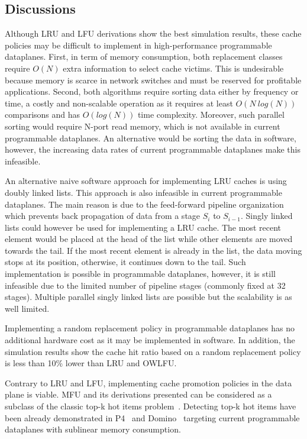 \subsection{Discussions}

Although LRU and LFU derivations show the best simulation results, these cache policies may be difficult to implement in high-performance programmable dataplanes.
First, in term of memory consumption, both replacement classes require $O(N)$ extra information to select cache victims.
This is undesirable because memory is scarce in network switches and must be reserved for profitable applications.
Second, both algorithms require sorting data either by frequency or time, a costly and non-scalable operation as it requires at least $O(N~log(N))$ comparisons and has $O(log(N))$ time complexity.
Moreover, such parallel sorting would require N-port read memory, which is not available in current programmable dataplanes.
An alternative would be sorting the data in software, however, the increasing data rates of current programmable dataplanes make this infeasible.  

An alternative naive software approach for implementing LRU caches is using doubly linked lists.
This approach is also infeasible in current programmable dataplanes.
The main reason is due to the feed-forward pipeline organization which prevents back propagation of data from a stage $S_{i}$ to $S_{i-1}$.
Singly linked lists could however be used for implementing a LRU cache.
The most recent element would be placed at the head of the list while other elements are moved towards the tail.
If the most recent element is already in the list, the data moving stops at its position, otherwise, it continues down to the tail.
Such implementation is possible in programmable dataplanes, however, it is still infeasible due to the limited number of pipeline stages (commonly fixed at 32 stages).
Multiple parallel singly linked lists are possible but the scalability is as well limited.

Implementing a random replacement policy in programmable dataplanes has no additional hardware cost as it may be implemented in software.
In addition, the simulation results show the cache hit ratio based on a random replacement policy is less than 10\% lower than LRU and OWLFU.

Contrary to LRU and LFU, implementing cache promotion policies in the data plane is viable.
MFU and its derivations presented can be considered as a subclass of the classic top-k hot items problem~\cite{Metwally:2005}.
Detecting top-k hot items have been already demonstrated in P4~\cite{Sivaraman:17} and Domino~\cite{SivaramanDomino:2016} targeting current programmable dataplanes with sublinear memory consumption.

